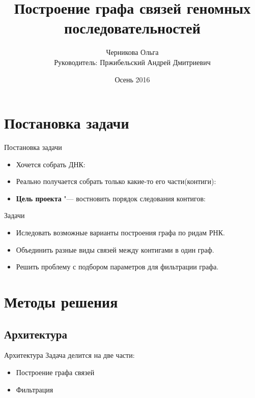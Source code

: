 \documentclass{beamer}
\title[Граф связей между контигами]{Построение графа связей геномных последовательностей}
\author[Черникова Ольга]{Черникова Ольга\\
	Руководитель: Пржибельский Андрей Дмитриевич}
\institute{СПб АУ РАН}
\date{Осень 2016}
\newcommand{\cimg}[2]{%
	\begin{center}%
		\ifthenelse{\equal{#2}{}}{%
			\texttt{[image: \#1]}
		}{%
			\texttt{[image: \#1]}
		}%
	\end{center}%
}
\begin{document}
\begin{frame}
	\titlepage
\end{frame}

\section{Постановка задачи}

\begin{frame}[t]{Постановка задачи}
	\begin{itemize}
		\item Хочется собрать ДНК:
		\cimg{p1_1.png}{1}
		\item Реально получается собрать только какие-то его части(контиги):
		\cimg{p1_2.png}{0.25}
		\item \textbf{Цель проекта} "--- востновить порядок следования контигов:
		\cimg{p1_3.png}{1} 
	\end{itemize}
\end{frame}

\begin{frame}[t]{Задачи}
\begin{itemize}
\item Иследовать возможные варианты построения графа по ридам РНК. 
\item Объединить разные виды связей между контигами в один граф. 
\item Решить проблему с подбором параметров для фильтрации графа. 
\end{itemize}
\end{frame}	

\section{Методы решения}
\subsection{Архитектура}
\begin{frame}[t]{Архитектура}
Задача делится на две части:
\begin{itemize}
\item Построение графа связей
\item Фильтрация
\end{itemize}	
\cimg{src.jpg}{0.65}
\end{frame}
\end{document}
